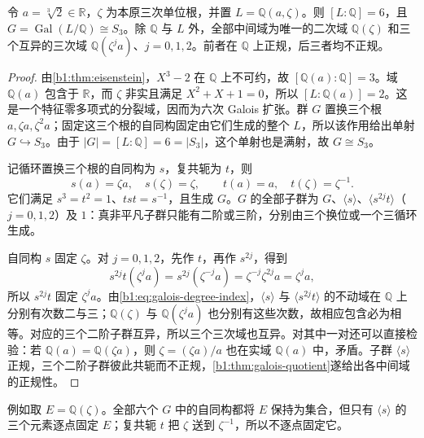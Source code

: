\begin{proposition}\label{b1:prop:cubic-splitting-field-correspondence}
	令 \(a=\sqrt[3]2\in\mathbb R\)，\(\zeta\) 为本原三次单位根，并置 \(L=\mathbb Q(a,\zeta)\)。则 \([L:\mathbb Q]=6\)，且 \(G=\operatorname{Gal}(L/\mathbb Q)\cong S_3\)。除 \(\mathbb Q\) 与 \(L\) 外，全部中间域为唯一的二次域 \(\mathbb Q(\zeta)\) 和三个互异的三次域 \(\mathbb Q(\zeta^j a)\)、\(j=0,1,2\)。前者在 \(\mathbb Q\) 上正规，后三者均不正规。
\end{proposition}
\begin{proof}
	由\cref{b1:thm:eisenstein}，\(X^3-2\) 在 \(\mathbb Q\) 上不可约，故 \([\mathbb Q(a):\mathbb Q]=3\)。域 \(\mathbb Q(a)\) 包含于 \(\mathbb R\)，而 \(\zeta\) 非实且满足 \(X^2+X+1=0\)，所以 \([L:\mathbb Q(a)]=2\)。这是一个特征零多项式的分裂域，因而为六次 Galois 扩张。群 \(G\) 置换三个根 \(a,\zeta a,\zeta^2a\)；固定这三个根的自同构固定由它们生成的整个 \(L\)，所以该作用给出单射 \(G\hookrightarrow S_3\)。由于 \(|G|=[L:\mathbb Q]=6=|S_3|\)，这个单射也是满射，故 \(G\cong S_3\)。

	记循环置换三个根的自同构为 \(s\)，复共轭为 \(t\)，则
	\[
		s(a)=\zeta a,\quad s(\zeta)=\zeta,\qquad t(a)=a,\quad t(\zeta)=\zeta^{-1}.
	\]
	它们满足 \(s^3=t^2=1\)、\(tst=s^{-1}\)，且生成 \(G\)。\(G\) 的全部子群为 \(G\)、\(\langle s\rangle\)、\(\langle s^{2j}t\rangle\)（\(j=0,1,2\)）及 \(1\)：真非平凡子群只能有二阶或三阶，分别由三个换位或一个三循环生成。

	自同构 \(s\) 固定 \(\zeta\)。对 \(j=0,1,2\)，先作 \(t\)，再作 \(s^{2j}\)，得到
	\[
		s^{2j}t(\zeta^j a)=s^{2j}(\zeta^{-j}a) =\zeta^{-j}\zeta^{2j}a=\zeta^j a,
	\]
	所以 \(s^{2j}t\) 固定 \(\zeta^j a\)。由\eqref{b1:eq:galois-degree-index}，\(\langle s\rangle\) 与 \(\langle s^{2j}t\rangle\) 的不动域在 \(\mathbb Q\) 上分别有次数二与三；\(\mathbb Q(\zeta)\) 与 \(\mathbb Q(\zeta^j a)\) 也分别有这些次数，故相应包含必为相等。对应的三个二阶子群互异，所以三个三次域也互异。对其中一对还可以直接检验：若 \(\mathbb Q(a)=\mathbb Q(\zeta a)\)，则 \(\zeta=(\zeta a)/a\) 也在实域 \(\mathbb Q(a)\) 中，矛盾。子群 \(\langle s\rangle\) 正规，三个二阶子群彼此共轭而不正规，\cref{b1:thm:galois-quotient}遂给出各中间域的正规性。
\end{proof}

例如取 \(E=\mathbb Q(\zeta)\)。全部六个 \(G\) 中的自同构都将 \(E\) 保持为集合，但只有 \(\langle s\rangle\) 的三个元素逐点固定 \(E\)；复共轭 \(t\) 把 \(\zeta\) 送到 \(\zeta^{-1}\)，所以不逐点固定它。

